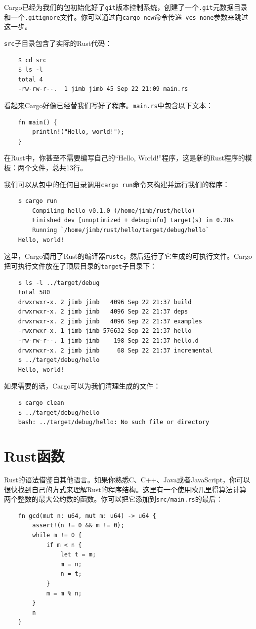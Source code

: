 Cargo已经为我们的包初始化好了\texttt{git}版本控制系统，创建了一个\texttt{.git}元数据目录和一个\texttt{.gitignore}文件。你可以通过向\texttt{cargo new}命令传递\texttt{--vcs none}参数来跳过这一步。

\texttt{src}子目录包含了实际的Rust代码：
\begin{verbatim}
    $ cd src
    $ ls -l
    total 4
    -rw-rw-r--.  1 jimb jimb 45 Sep 22 21:09 main.rs
\end{verbatim}

看起来Cargo好像已经替我们写好了程序。\texttt{main.rs}中包含以下文本：
\begin{verbatim}
    fn main() {
        println!("Hello, world!");
    }
\end{verbatim}

在Rust中，你甚至不需要编写自己的“Hello, World!”程序，这是新的Rust程序的模板：两个文件，总共13行。

我们可以从包中的任何目录调用\texttt{cargo run}命令来构建并运行我们的程序：
\begin{verbatim}
    $ cargo run
        Compiling hello v0.1.0 (/home/jimb/rust/hello)
        Finished dev [unoptimized + debuginfo] target(s) in 0.28s
        Running `/home/jimb/rust/hello/target/debug/hello`
    Hello, world!
\end{verbatim}

这里，Cargo调用了Rust的编译器\texttt{rustc}，然后运行了它生成的可执行文件。Cargo把可执行文件放在了顶层目录的\texttt{target}子目录下：
\begin{verbatim}
    $ ls -l ../target/debug
    total 580
    drwxrwxr-x. 2 jimb jimb   4096 Sep 22 21:37 build
    drwxrwxr-x. 2 jimb jimb   4096 Sep 22 21:37 deps
    drwxrwxr-x. 2 jimb jimb   4096 Sep 22 21:37 examples
    -rwxrwxr-x. 1 jimb jimb 576632 Sep 22 21:37 hello
    -rw-rw-r--. 1 jimb jimb    198 Sep 22 21:37 hello.d
    drwxrwxr-x. 2 jimb jimb     68 Sep 22 21:37 incremental
    $ ../target/debug/hello
    Hello, world!
\end{verbatim}

如果需要的话，Cargo可以为我们清理生成的文件：
\begin{verbatim}
    $ cargo clean
    $ ../target/debug/hello
    bash: ../target/debug/hello: No such file or directory
\end{verbatim}

\section{Rust函数}
Rust的语法借鉴自其他语言。如果你熟悉C、C++、Java或者JavaScript，你可以很快找到自己的方式来理解Rust的程序结构。这里有一个使用\href{https://en.wikipedia.org/wiki/Euclidean_algorithm}{欧几里得算法}计算两个整数的最大公约数的函数。你可以把它添加到\texttt{src/main.rs}的最后：
\begin{verbatim}
    fn gcd(mut n: u64, mut m: u64) -> u64 {
        assert!(n != 0 && m != 0);
        while m != 0 {
            if m < n {
                let t = m;
                m = n;
                n = t;
            }
            m = m % n;
        }
        n
    }
\end{verbatim}

